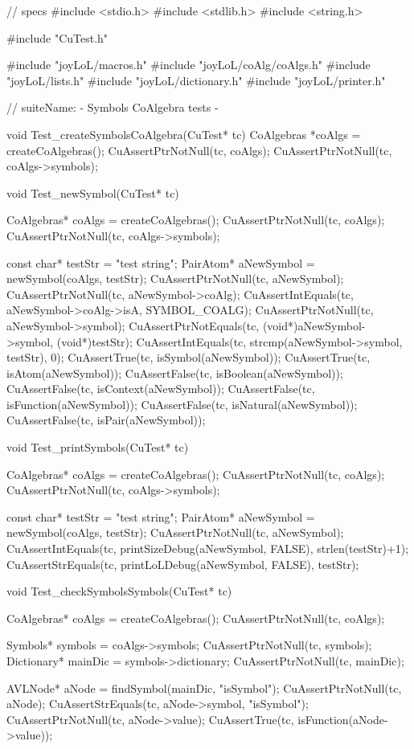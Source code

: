 \starttyping
// specs
#include <stdio.h>
#include <stdlib.h>
#include <string.h>

#include "CuTest.h"

#include "joyLoL/macros.h"
#include "joyLoL/coAlg/coAlgs.h"
#include "joyLoL/lists.h"
#include "joyLoL/dictionary.h"
#include "joyLoL/printer.h"

// suiteName: - Symbols CoAlgebra tests -

void Test_createSymbolsCoAlgebra(CuTest* tc) {
  CoAlgebras *coAlgs = createCoAlgebras();
  CuAssertPtrNotNull(tc, coAlgs);
  CuAssertPtrNotNull(tc, coAlgs->symbols);
}

void Test_newSymbol(CuTest* tc) {
  CoAlgebras* coAlgs = createCoAlgebras();
  CuAssertPtrNotNull(tc, coAlgs);
  CuAssertPtrNotNull(tc, coAlgs->symbols);

  const char* testStr = "test string";
  PairAtom* aNewSymbol = newSymbol(coAlgs, testStr);
  CuAssertPtrNotNull(tc, aNewSymbol);
  CuAssertPtrNotNull(tc, aNewSymbol->coAlg);
  CuAssertIntEquals(tc, aNewSymbol->coAlg->isA, SYMBOL_COALG);
  CuAssertPtrNotNull(tc, aNewSymbol->symbol);
  CuAssertPtrNotEquals(tc, (void*)aNewSymbol->symbol, (void*)testStr);
  CuAssertIntEquals(tc, strcmp(aNewSymbol->symbol, testStr), 0);
  CuAssertTrue(tc, isSymbol(aNewSymbol));
  CuAssertTrue(tc, isAtom(aNewSymbol));
  CuAssertFalse(tc, isBoolean(aNewSymbol));
  CuAssertFalse(tc, isContext(aNewSymbol));
  CuAssertFalse(tc, isFunction(aNewSymbol));
  CuAssertFalse(tc, isNatural(aNewSymbol));
  CuAssertFalse(tc, isPair(aNewSymbol));
}

void Test_printSymbols(CuTest* tc) {
  CoAlgebras* coAlgs = createCoAlgebras();
  CuAssertPtrNotNull(tc, coAlgs);
  CuAssertPtrNotNull(tc, coAlgs->symbols);

  const char* testStr = "test string";
  PairAtom* aNewSymbol = newSymbol(coAlgs, testStr);
  CuAssertPtrNotNull(tc, aNewSymbol);
  CuAssertIntEquals(tc, printSizeDebug(aNewSymbol, FALSE), strlen(testStr)+1);
  CuAssertStrEquals(tc, printLoLDebug(aNewSymbol, FALSE), testStr);
}

void Test_checkSymbolsSymbols(CuTest* tc) {
  CoAlgebras* coAlgs = createCoAlgebras();
  CuAssertPtrNotNull(tc, coAlgs);

  Symbols* symbols = coAlgs->symbols;
  CuAssertPtrNotNull(tc, symbols);
  Dictionary* mainDic = symbols->dictionary;
  CuAssertPtrNotNull(tc, mainDic);

  AVLNode* aNode = findSymbol(mainDic, "isSymbol");
  CuAssertPtrNotNull(tc, aNode);
  CuAssertStrEquals(tc, aNode->symbol, "isSymbol");
  CuAssertPtrNotNull(tc, aNode->value);
  CuAssertTrue(tc, isFunction(aNode->value));
}
\stoptyping